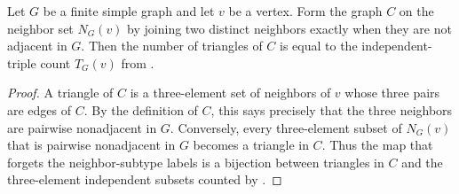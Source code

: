 \begin{helper}
Let $G$ be a finite simple graph and let $v$ be a vertex.  Form the graph
$C$ on the neighbor set $N_G(v)$ by joining two distinct neighbors exactly
when they are not adjacent in $G$.  Then the number of triangles of $C$ is
equal to the independent-triple count $T_G(v)$ from
.
\end{helper}
\begin{proof}
A triangle of $C$ is a three-element set of neighbors of $v$ whose three
pairs are edges of $C$.  By the definition of $C$, this says precisely that
the three neighbors are pairwise nonadjacent in $G$.  Conversely, every
three-element subset of $N_G(v)$ that is pairwise nonadjacent in $G$ becomes
a triangle in $C$.  Thus the map that forgets the neighbor-subtype labels is
a bijection between triangles in $C$ and the three-element independent
subsets counted by .
\end{proof}
